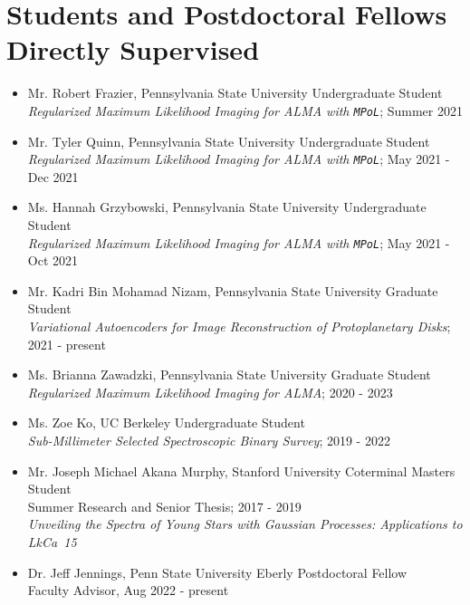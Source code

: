 \section*{Students and Postdoctoral Fellows Directly Supervised}
\begin{itemize}
  \item Mr. Robert Frazier, Pennsylvania State University Undergraduate Student \\ 
  \emph{Regularized Maximum Likelihood Imaging for ALMA with \texttt{MPoL}}; Summer 2021
  \item Mr. Tyler Quinn, Pennsylvania State University Undergraduate Student \\ 
  \emph{Regularized Maximum Likelihood Imaging for ALMA with \texttt{MPoL}}; May 2021 - Dec 2021
  \item Ms. Hannah Grzybowski, Pennsylvania State University Undergraduate Student \\ 
  \emph{Regularized Maximum Likelihood Imaging for ALMA with \texttt{MPoL}}; May 2021 - Oct 2021
  \item Mr. Kadri Bin Mohamad Nizam, Pennsylvania State University Graduate Student \\ 
  \emph{Variational Autoencoders for Image Reconstruction of Protoplanetary Disks}; 2021 - present
  \item Ms. Brianna Zawadzki, Pennsylvania State University Graduate Student \\
  \emph{Regularized Maximum Likelihood Imaging for ALMA}; 2020 - 2023
  \item Ms. Zoe Ko, UC Berkeley Undergraduate Student \\ 
  \emph{Sub-Millimeter Selected Spectroscopic Binary Survey}; 2019 - 2022 
  \item Mr. Joseph Michael Akana Murphy, Stanford University Coterminal Masters Student \\
  Summer Research and Senior Thesis; 2017 - 2019\\
  \emph{Unveiling the Spectra of Young Stars with Gaussian Processes: Applications to LkCa~15}
  \item Dr. Jeff Jennings, Penn State University Eberly Postdoctoral Fellow \\
  Faculty Advisor, Aug 2022 - present\\
\end{itemize}
